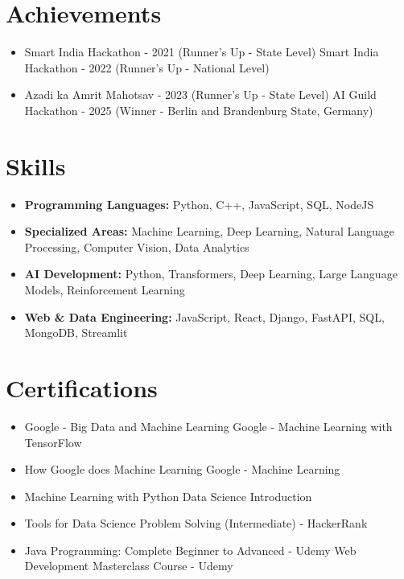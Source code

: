 \documentclass[a4paper,10pt]{article}
\begin{document}
\section*{Achievements}
\begin{itemize}
\item Smart India Hackathon - 2021 (Runner's Up - State Level) \hfill Smart India Hackathon - 2022 (Runner's Up - National Level)
\item Azadi ka Amrit Mahotsav - 2023 (Runner's Up - State Level) \hfill AI Guild Hackathon - 2025 (Winner - Berlin and Brandenburg State, Germany)
\end{itemize}

\section*{Skills}
\begin{itemize}
  \item \textbf{Programming Languages:} Python, C++, JavaScript, SQL, NodeJS
  \item \textbf{Specialized Areas:} Machine Learning, Deep Learning, Natural Language Processing, Computer Vision, Data Analytics
  \item \textbf{AI Development:} Python, Transformers, Deep Learning, Large Language Models, Reinforcement Learning
  \item \textbf{Web \& Data Engineering:} JavaScript, React, Django, FastAPI, SQL, MongoDB, Streamlit
\end{itemize}

\section*{Certifications}
\begin{itemize}
\item Google - Big Data and Machine Learning \hfill Google - Machine Learning with TensorFlow
\item How Google does Machine Learning \hfill Google - Machine Learning
\item Machine Learning with Python \hfill Data Science Introduction
\item Tools for Data Science \hfill Problem Solving (Intermediate) - HackerRank
\item Java Programming: Complete Beginner to Advanced - Udemy \hfill Web Development Masterclass Course - Udemy
\end{itemize}
\end{document}
